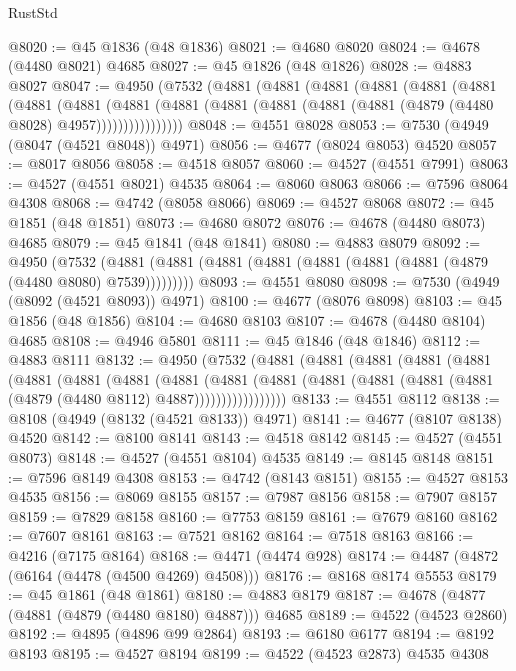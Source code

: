 \begin{lexlean}{RustStd}
\begin{coremodule}
@8020 := @45 @1836 (@48 @1836)
@8021 := @4680 @8020
@8024 := @4678 (@4480 @8021) @4685
@8027 := @45 @1826 (@48 @1826)
@8028 := @4883 @8027
@8047 := @4950
    (@7532
      (@4881
        (@4881
          (@4881
            (@4881
              (@4881
                (@4881
                  (@4881
                    (@4881
                      (@4881
                        (@4881
                          (@4881 (@4881 (@4881 (@4881 (@4879 (@4480 @8028) @4957))))))))))))))))
@8048 := @4551 @8028
@8053 := @7530 (@4949 (@8047 (@4521 @8048)) @4971)
@8056 := @4677 (@8024 @8053) @4520
@8057 := @8017 @8056
@8058 := @4518 @8057
@8060 := @4527 (@4551 @7991)
@8063 := @4527 (@4551 @8021) @4535
@8064 := @8060 @8063
@8066 := @7596 @8064 @4308
@8068 := @4742 (@8058 @8066)
@8069 := @4527 @8068
@8072 := @45 @1851 (@48 @1851)
@8073 := @4680 @8072
@8076 := @4678 (@4480 @8073) @4685
@8079 := @45 @1841 (@48 @1841)
@8080 := @4883 @8079
@8092 := @4950
    (@7532 (@4881 (@4881 (@4881 (@4881 (@4881 (@4881 (@4881 (@4879 (@4480 @8080) @7539)))))))))
@8093 := @4551 @8080
@8098 := @7530 (@4949 (@8092 (@4521 @8093)) @4971)
@8100 := @4677 (@8076 @8098)
@8103 := @45 @1856 (@48 @1856)
@8104 := @4680 @8103
@8107 := @4678 (@4480 @8104) @4685
@8108 := @4946 @5801
@8111 := @45 @1846 (@48 @1846)
@8112 := @4883 @8111
@8132 := @4950
    (@7532
      (@4881
        (@4881
          (@4881
            (@4881
              (@4881
                (@4881
                  (@4881
                    (@4881
                      (@4881
                        (@4881
                          (@4881
                            (@4881 (@4881 (@4881 (@4881 (@4879 (@4480 @8112) @4887)))))))))))))))))
@8133 := @4551 @8112
@8138 := @8108 (@4949 (@8132 (@4521 @8133)) @4971)
@8141 := @4677 (@8107 @8138) @4520
@8142 := @8100 @8141
@8143 := @4518 @8142
@8145 := @4527 (@4551 @8073)
@8148 := @4527 (@4551 @8104) @4535
@8149 := @8145 @8148
@8151 := @7596 @8149 @4308
@8153 := @4742 (@8143 @8151)
@8155 := @4527 @8153 @4535
@8156 := @8069 @8155
@8157 := @7987 @8156
@8158 := @7907 @8157
@8159 := @7829 @8158
@8160 := @7753 @8159
@8161 := @7679 @8160
@8162 := @7607 @8161
@8163 := @7521 @8162
@8164 := @7518 @8163
@8166 := @4216 (@7175 @8164)
@8168 := @4471 (@4474 @928)
@8174 := @4487 (@4872 (@6164 (@4478 (@4500 @4269) @4508)))
@8176 := @8168 @8174 @5553
@8179 := @45 @1861 (@48 @1861)
@8180 := @4883 @8179
@8187 := @4678 (@4877 (@4881 (@4879 (@4480 @8180) @4887))) @4685
@8189 := @4522 (@4523 @2860)
@8192 := @4895 (@4896 @99 @2864)
@8193 := @6180 @6177
@8194 := @8192 @8193
@8195 := @4527 @8194
@8199 := @4522 (@4523 @2873) @4535 @4308

\end{coremodule}
\end{lexlean}
